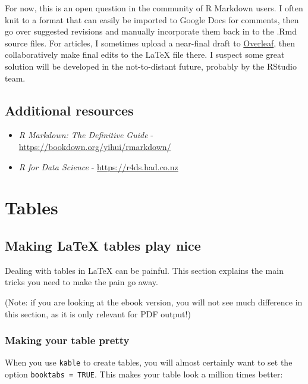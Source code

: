 \documentclass[a4paper, twoside]{templates/ociamthesis}
\theoremstyle{definition}
\theoremstyle{definition}
\theoremstyle{definition}
\theoremstyle{definition}
\theoremstyle{remark}
\begin{document}
For now, this is an open question in the community of R Markdown users.
I often knit to a format that can easily be imported to Google Docs for comments, then go over suggested revisions and manually incorporate them back in to the .Rmd source files.
For articles, I sometimes upload a near-final draft to \href{https://www.overleaf.com/}{Overleaf}, then collaboratively make final edits to the LaTeX file there.
I suspect some great solution will be developed in the not-to-distant future, probably by the RStudio team.

\hypertarget{additional-resources}{%
\section{Additional resources}\label{additional-resources}}

\begin{itemize}
\item
  \emph{R Markdown: The Definitive Guide} - \url{https://bookdown.org/yihui/rmarkdown/}
\item
  \emph{R for Data Science} - \url{https://r4ds.had.co.nz}
\end{itemize}

\hypertarget{tables}{%
\chapter{Tables}\label{tables}}

\minitoc 

\hypertarget{making-latex-tables-play-nice}{%
\section{Making LaTeX tables play nice}\label{making-latex-tables-play-nice}}

Dealing with tables in LaTeX can be painful.
This section explains the main tricks you need to make the pain go away.

(Note: if you are looking at the ebook version, you will not see much difference in this section, as it is only relevant for PDF output!)

\hypertarget{making-your-table-pretty}{%
\subsection{Making your table pretty}\label{making-your-table-pretty}}

When you use \texttt{kable} to create tables, you will almost certainly want to set the option \texttt{booktabs\ =\ TRUE}.
This makes your table look a million times better:
\end{document}
